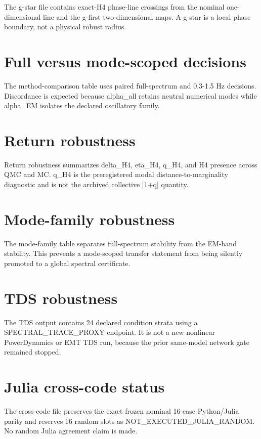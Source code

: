 \documentclass[11pt]{article}
\begin{document}
The g-star file contains exact-H4 phase-line crossings from the nominal one-dimensional line and the g-first two-dimensional maps. A g-star is a local phase boundary, not a physical robust radius.

\section{Full versus mode-scoped decisions}

The method-comparison table uses paired full-spectrum and 0.3-1.5 Hz decisions. Discordance is expected because alpha_all retains neutral numerical modes while alpha_EM isolates the declared oscillatory family.

\section{Return robustness}

Return robustness summarizes delta_H4, eta_H4, q_H4, and H4 presence across QMC and MC. q_H4 is the preregistered modal distance-to-marginality diagnostic and is not the archived collective |1+q| quantity.

\section{Mode-family robustness}

The mode-family table separates full-spectrum stability from the EM-band stability. This prevents a mode-scoped transfer statement from being silently promoted to a global spectral certificate.

\section{TDS robustness}

The TDS output contains 24 declared condition strata using a SPECTRAL_TRACE_PROXY endpoint. It is not a new nonlinear PowerDynamics or EMT TDS run, because the prior same-model network gate remained stopped.

\section{Julia cross-code status}

The cross-code file preserves the exact frozen nominal 16-case Python/Julia parity and reserves 16 random slots as NOT_EXECUTED_JULIA_RANDOM. No random Julia agreement claim is made.
\end{document}
